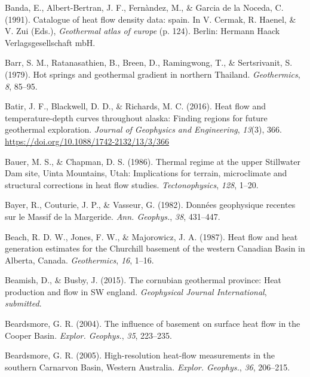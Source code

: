 \documentclass[draft,linenumbers]{agujournal2018}
\begin{document}
\leavevmode{}%
Banda, E., Albert-Bertran, J. F., Fernàndez, M., \& Garcia de la Noceda,
C. (1991). Catalogue of heat flow density data: spain. In V. Cermak, R.
Haenel, \& V. Zui (Eds.), \emph{Geothermal atlas of europe} (p. 124).
Berlin: Hermann Haack Verlagsgesellschaft mbH.

\leavevmode{}%
Barr, S. M., Ratanasathien, B., Breen, D., Ramingwong, T., \&
Sertsrivanit, S. (1979). Hot springs and geothermal gradient in northern
{Thailand}. \emph{Geothermics}, \emph{8}, 85--95.

\leavevmode{}%
Batir, J. F., Blackwell, D. D., \& Richards, M. C. (2016). Heat flow and
temperature-depth curves throughout alaska: Finding regions for future
geothermal exploration. \emph{Journal of Geophysics and Engineering},
\emph{13}(3), 366. \url{https://doi.org/10.1088/1742-2132/13/3/366}

\leavevmode{}%
Bauer, M. S., \& Chapman, D. S. (1986). Thermal regime at the upper
{Stillwater Dam} site, {Uinta Mountains, Utah}: Implications for
terrain, microclimate and structural corrections in heat flow studies.
\emph{Tectonophysics}, \emph{128}, 1--20.

\leavevmode{}%
Bayer, R., Couturie, J. P., \& Vasseur, G. (1982). Donn{é}es geophysique
recentes sur le {Massif de la Margeride}. \emph{Ann. Geophys.},
\emph{38}, 431--447.

\leavevmode{}%
Beach, R. D. W., Jones, F. W., \& Majorowicz, J. A. (1987). Heat flow
and heat generation estimates for the {Churchill} basement of the
western {Canadian Basin} in {Alberta, Canada}. \emph{Geothermics},
\emph{16}, 1--16.

\leavevmode{}%
Beamish, D., \& Busby, J. (2015). The cornubian geothermal province:
Heat production and flow in SW england. \emph{Geophysical Journal
International}, \emph{submitted}.

\leavevmode{}%
Beardsmore, G. R. (2004). The influence of basement on surface heat flow
in the {Cooper Basin}. \emph{Explor. Geophys.}, \emph{35}, 223--235.

\leavevmode{}%
Beardsmore, G. R. (2005). High-resolution heat-flow measurements in the
southern {Carnarvon Basin, Western Australia}. \emph{Explor. Geophys.},
\emph{36}, 206--215.
\end{document}
